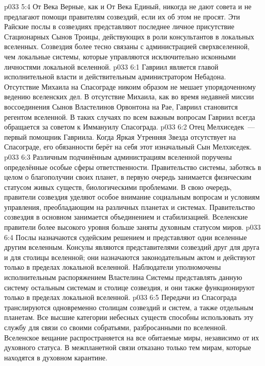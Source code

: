 \vs p033 5:4 От Века Верные, как и От Века Единый, никогда не дают совета и не предлагают помощи правителям созвездий, если их об этом не просят. Эти Райские послы в созвездиях представляют последнее личное присутствие Стационарных Сынов Троицы, действующих в роли консультантов в локальных вселенных. Созвездия более тесно связаны с администрацией сверхвселенной, чем локальные системы, которые управляются исключительно исконными личностями локальной вселенной.
\vs p033 6:1 Гавриил является главой исполнительной власти и действительным администратором Небадона. Отсутствие Михаила на Спасограде никоим образом не мешает упорядоченному ведению вселенских дел. В отсутствие Михаила, как во время недавней миссии воссоединения Сынов Властелинов Орвонтона на Рае, Гавриил становится регентом вселенной. В таких случаях по всем важным вопросам Гавриил всегда обращается за советом к Иммануилу Спасограда.
\vs p033 6:2 Отец Мелхиседек~--- первый помощник Гавриила. Когда Яркая Утренняя Звезда отсутствует на Спасограде, его обязанности берёт на себя этот изначальный Сын Мелхиседек.
\vs p033 6:3 \pc Различным подчинённым администрациям вселенной поручены определённые особые сферы ответственности. Правительство системы, заботясь в целом о благополучии своих планет, в первую очередь занимается физическим статусом живых существ, биологическими проблемами. В свою очередь, правители созвездия уделяют особое внимание социальным вопросам и условиям управления, преобладающим на различных планетах и системах. Правительство созвездия в основном занимается объединением и стабилизацией. Вселенские правители более высокого уровня больше заняты духовным статусом миров.
\vs p033 6:4 \pc Послы назначаются судейским решением и представляют одни вселенные другим вселенным. Консулы являются представителями созвездий друг для друга и для столицы вселенной; они назначаются законодательным актом и действуют только в пределах локальной вселенной. Наблюдатели уполномочены исполнительным распоряжением Властелина Системы представлять данную систему остальным системам и столице созвездия, и они также функционируют только в пределах локальной вселенной.
\vs p033 6:5 \pc Передачи из Спасограда транслируются одновременно столицам созвездий и систем, а также отдельным планетам. Все высшие категории небесных существ способны использовать эту службу для связи со своими собратьями, разбросанными по вселенной. Вселенское вещание распространяется на все обитаемые миры, независимо от их духовного статуса. В межпланетной связи отказано только тем мирам, которые находятся в духовном карантине.
